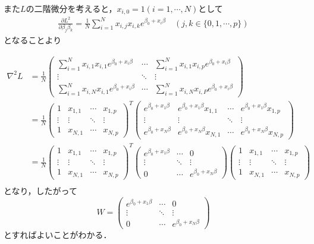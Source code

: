 \documentclass{jsarticle}
\theoremstyle{definition}
\theoremstyle{mystyle} %
\begin{document}
また$L$の二階微分を考えると，$x_{i,0}=1(i=1,\cdots ,N)$として
\begin{align*}
\frac{\partial L^2}{\partial \beta_j \beta_k}=\frac{1}{N}\sum_{i=1}^Nx_{i,j}x_{i,k}e^{\beta_0+x_i\beta}\quad (j,k\in\{0,1,\cdots,p\})
\end{align*}
となることより

\begin{align*}
\nabla^2 L&=\frac{1}{N}\begin{pmatrix}
\sum_{i=1}^Nx_{i,1}x_{i,1}e^{\beta_0+x_i\beta} & \cdots & \sum_{i=1}^Nx_{i,1}x_{i,p}e^{\beta_0+x_i\beta}\\
\vdots & \ddots & \vdots \\
\sum_{i=1}^Nx_{i,N}x_{i,1}e^{\beta_0+x_i\beta} & \cdots & \sum_{i=1}^Nx_{i,N}x_{i,P}e^{\beta_0+x_i\beta}
\end{pmatrix}\\
&=\frac{1}{N}\begin{pmatrix}
1 & x_{1,1} & \cdots & x_{1,p}\\
\vdots & \vdots &\ddots & \vdots\\
1 & x_{N,1}&\cdots & x_{N,p}
\end{pmatrix}^T\begin{pmatrix}
e^{\beta_0+x_1\beta}& e^{\beta_0+x_1\beta}x_{1,1} & \cdots & e^{\beta_0+x_1\beta}x_{1,p}\\
\vdots & \vdots &\ddots & \vdots\\
e^{\beta_0+x_N\beta}& e^{\beta_0+x_N\beta}x_{N,1}&\cdots & e^{\beta_0+x_N\beta}x_{N,p}
\end{pmatrix}\\
&=\frac{1}{N}\begin{pmatrix}
1 & x_{1,1} & \cdots & x_{1,p}\\
\vdots & \vdots &\ddots & \vdots\\
1 & x_{N,1}&\cdots & x_{N,p}
\end{pmatrix}^T\begin{pmatrix}
e^{\beta_0+x_1\beta} & \cdots & 0\\
\vdots  & \ddots & \vdots\\
0 & \cdots & e^{\beta_0+x_N\beta}
\end{pmatrix}\begin{pmatrix}
1 & x_{1,1} & \cdots & x_{1,p}\\
\vdots & \vdots &\ddots & \vdots\\
1 & x_{N,1}&\cdots & x_{N,p}
\end{pmatrix}\\
\end{align*}
となり，したがって
$$W=\begin{pmatrix}
e^{\beta_0+x_1\beta} & \cdots & 0\\
\vdots  & \ddots & \vdots\\
0 & \cdots & e^{\beta_0+x_N\beta}
\end{pmatrix}$$
とすればよいことがわかる．
\end{document}
